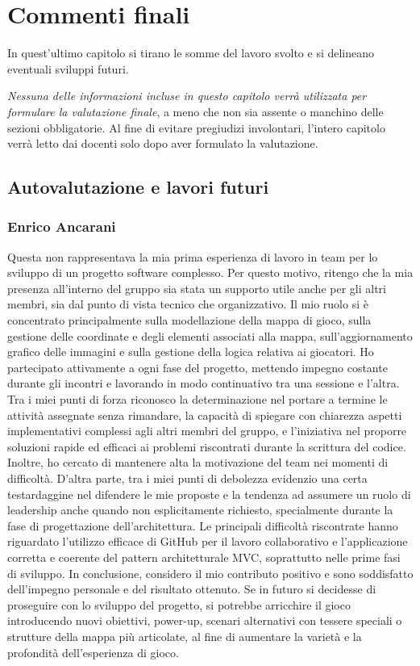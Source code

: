 \documentclass[a4paper,12pt]{report}
\begin{document}
\chapter{Commenti finali}

In quest'ultimo capitolo si tirano le somme del lavoro svolto e si delineano eventuali sviluppi
futuri.

\textit{Nessuna delle informazioni incluse in questo capitolo verrà utilizzata per formulare la valutazione finale}, a meno che non sia assente o manchino delle sezioni obbligatorie.
%
Al fine di evitare pregiudizi involontari, l'intero capitolo verrà letto dai docenti solo dopo aver formulato la valutazione.

\section{Autovalutazione e lavori futuri}

\subsection{Enrico Ancarani}
Questa non rappresentava la mia prima esperienza di lavoro in team per lo sviluppo di un progetto software complesso. 
Per questo motivo, ritengo che la mia presenza all'interno del gruppo sia stata un supporto utile anche per gli altri membri, sia dal punto di vista tecnico che organizzativo.
Il mio ruolo si è concentrato principalmente sulla modellazione della mappa di gioco, sulla gestione delle coordinate e degli elementi associati alla mappa, 
sull’aggiornamento grafico delle immagini e sulla gestione della logica relativa ai giocatori. Ho partecipato attivamente a ogni fase del progetto, mettendo impegno 
costante durante gli incontri e lavorando in modo continuativo tra una sessione e l’altra.
Tra i miei punti di forza riconosco la determinazione nel portare a termine le attività assegnate senza rimandare, la capacità di spiegare con chiarezza aspetti 
implementativi complessi agli altri membri del gruppo, e l'iniziativa nel proporre soluzioni rapide ed efficaci ai problemi riscontrati durante la scrittura del codice. 
Inoltre, ho cercato di mantenere alta la motivazione del team nei momenti di difficoltà.
D’altra parte, tra i miei punti di debolezza evidenzio una certa testardaggine nel difendere le mie proposte e la tendenza ad assumere un ruolo di leadership anche 
quando non esplicitamente richiesto, specialmente durante la fase di progettazione dell’architettura.
Le principali difficoltà riscontrate hanno riguardato l’utilizzo efficace di GitHub per il lavoro collaborativo e l’applicazione corretta e coerente del pattern 
architetturale MVC, soprattutto nelle prime fasi di sviluppo.
In conclusione, considero il mio contributo positivo e sono soddisfatto dell’impegno personale e del risultato ottenuto. 
Se in futuro si decidesse di proseguire con lo sviluppo del progetto, si potrebbe arricchire il gioco introducendo nuovi obiettivi, 
power-up, scenari alternativi con tessere speciali o strutture della mappa più articolate, al fine di aumentare la varietà e la profondità dell’esperienza di gioco.
\end{document}
